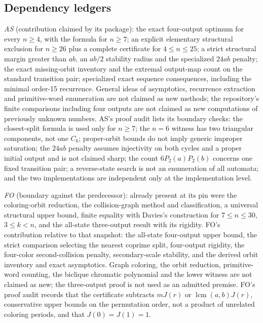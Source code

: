 \documentclass[11pt,a4paper]{article}
\numberwithin{equation}{section}
\theoremstyle{definition}
\theoremstyle{remark}
\newcommand{\lcm}{\operatorname{lcm}}
\begin{document}
\subsection{Dependency ledgers}

\emph{AS} (contribution claimed by its package): the exact four-output optimum
for every $n\ge4$, with the formula for $n\ge7$; an explicit elementary
structural exclusion for $n\ge26$ plus a complete certificate for
$4\le n\le25$; a strict structural margin greater than $ab$, an $ab/2$
stability radius and the specialized $24ab$ penalty; the exact missing-orbit
inventory and the extremal output-map count on the standard transition pair;
specialized exact sequence consequences, including the minimal order-15
recurrence. General ideas of asymptotics, recurrence extraction and
primitive-word enumeration are not claimed as new methods; the repository's
finite comparisons including four outputs are not claimed as new computations
of previously unknown numbers. AS's proof audit lists its boundary checks: the
closest-split formula is used only for $n\ge7$; the $n=6$ witness has two
triangular components, not one $C_6$; proper-orbit bounds do not imply generic
improper saturation; the $24ab$ penalty assumes injectivity on both cycles and
a proper initial output and is not claimed sharp; the count
$6P_2(a)P_2(b)$ concerns one fixed transition pair; a reverse-state search is
not an enumeration of all automata; and the two implementations are
independent only at the implementation level.

\emph{FO} (boundary against the predecessor): already present at its pin were
the coloring-orbit reduction, the collision-graph method and classification, a
universal structural upper bound, finite equality with Davies's construction
for $7\le n\le30$, $3\le k<n$, and the all-state three-output result with its
rigidity. FO's contribution relative to that snapshot: the all-state
four-output upper bound, the strict comparison selecting the nearest coprime
split, four-output rigidity, the four-color second-collision penalty,
secondary-scale stability, and the derived orbit inventory and exact
asymptotics. Graph coloring, the orbit reduction, primitive-word counting, the
biclique chromatic polynomial and the lower witness are not claimed as new;
the three-output proof is not used as an admitted premise. FO's proof audit
records that the certificate subtracts $mJ(r)$ or $\lcm(a,b)J(r)$, conservative
upper bounds on the permutation order, not a product of unrelated coloring
periods, and that $J(0)=J(1)=1$.
\end{document}
